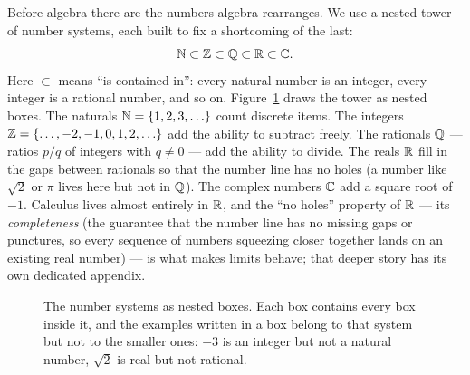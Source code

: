 Before algebra there are the numbers algebra rearranges. We use a nested tower of
number systems, each built to fix a shortcoming of the last:
\[
  \mathbb{N} \subset \mathbb{Z} \subset \mathbb{Q} \subset \mathbb{R} \subset \mathbb{C}.
\]
Here $\subset$ means ``is contained in'': every natural number is an integer,
every integer is a rational number, and so on. Figure~\ref{ch40:fig-tower} draws
the tower as nested boxes. The naturals $\N = \set{1,2,3,\dots}$ count discrete items. The integers
$\Z = \set{\dots,-2,-1,0,1,2,\dots}$ add the ability to subtract freely. The
rationals $\mathbb{Q}$ --- ratios $p/q$ of integers with $q \neq 0$ --- add the ability to
divide. The reals $\mathbb{R}$ fill in the gaps between rationals so that the number line
has no holes (a number like $\sqrt 2$ or $\pi$ lives here but not in $\mathbb{Q}$). The
complex numbers $\mathbb{C}$ add a square root of $-1$. Calculus lives almost entirely in
$\mathbb{R}$, and the ``no holes'' property of $\mathbb{R}$ --- its \emph{completeness} (the
guarantee that the number line has no missing gaps or punctures, so every sequence
of numbers squeezing closer together lands on an existing real number) ---
is what makes limits behave; that deeper story has its own dedicated appendix.

\begin{figure}[htbp]
\centering
{}
\caption{The number systems as nested boxes. Each box contains every box inside
it, and the examples written in a box belong to that system but not to the
smaller ones: $-3$ is an integer but not a natural number, $\sqrt2$ is real but
not rational.}
\label{ch40:fig-tower}
\end{figure}


